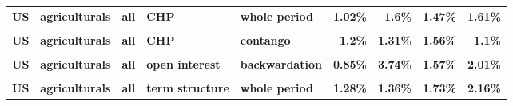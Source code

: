 \documentclass[
  authoryear,
  preprint,
  3p]{elsarticle}
\begin{document}
\begin{landscape}
\begin{longtable}[t]{>{}l>{}l>{}l>{}l>{}l>{}r>{}r>{}r>{}r}
\textbf{US} & \textbf{agriculturals} & \textbf{all} & \textbf{CHP} & \textbf{whole period} & \textcolor[HTML]{4285f4}{\textbf{1.02\%}} & \textcolor[HTML]{4285f4}{\textbf{1.6\%}} & \textcolor[HTML]{4285f4}{\textbf{1.47\%}} & \textcolor[HTML]{4285f4}{\textbf{1.61\%}}\\
\textbf{\cellcolor{gray!10}{US}} & \textbf{\cellcolor{gray!10}{agriculturals}} & \textbf{\cellcolor{gray!10}{all}} & \textbf{\cellcolor{gray!10}{CHP}} & \textbf{\cellcolor{gray!10}{backwardation}} & \textcolor[HTML]{4285f4}{\textbf{\cellcolor{gray!10}{1.14\%}}} & \textcolor[HTML]{4285f4}{\textbf{\cellcolor{gray!10}{2.47\%}}} & \textcolor[HTML]{4285f4}{\textbf{\cellcolor{gray!10}{1.72\%}}} & \textcolor[HTML]{4285f4}{\textbf{\cellcolor{gray!10}{3.11\%}}}\\
\textbf{US} & \textbf{agriculturals} & \textbf{all} & \textbf{CHP} & \textbf{contango} & \textcolor[HTML]{4285f4}{\textbf{1.2\%}} & \textcolor[HTML]{4285f4}{\textbf{1.31\%}} & \textcolor[HTML]{4285f4}{\textbf{1.56\%}} & \textcolor[HTML]{4285f4}{\textbf{1.1\%}}\\
\addlinespace
\textbf{\cellcolor{gray!10}{US}} & \textbf{\cellcolor{gray!10}{agriculturals}} & \textbf{\cellcolor{gray!10}{all}} & \textbf{\cellcolor{gray!10}{open interest}} & \textbf{\cellcolor{gray!10}{whole period}} & \textcolor[HTML]{4285f4}{\textbf{\cellcolor{gray!10}{1.09\%}}} & \textcolor[HTML]{4285f4}{\textbf{\cellcolor{gray!10}{1.9\%}}} & \textcolor[HTML]{4285f4}{\textbf{\cellcolor{gray!10}{0.45\%}}} & \textcolor[HTML]{4285f4}{\textbf{\cellcolor{gray!10}{1\%}}}\\
\textbf{US} & \textbf{agriculturals} & \textbf{all} & \textbf{open interest} & \textbf{backwardation} & \textcolor[HTML]{4285f4}{\textbf{0.85\%}} & \textcolor[HTML]{4285f4}{\textbf{3.74\%}} & \textcolor[HTML]{4285f4}{\textbf{1.57\%}} & \textcolor[HTML]{4285f4}{\textbf{2.01\%}}\\
\textbf{\cellcolor{gray!10}{US}} & \textbf{\cellcolor{gray!10}{agriculturals}} & \textbf{\cellcolor{gray!10}{all}} & \textbf{\cellcolor{gray!10}{open interest}} & \textbf{\cellcolor{gray!10}{contango}} & \textcolor[HTML]{4285f4}{\textbf{\cellcolor{gray!10}{1.58\%}}} & \textcolor[HTML]{4285f4}{\textbf{\cellcolor{gray!10}{0.97\%}}} & \textcolor[HTML]{4285f4}{\textbf{\cellcolor{gray!10}{0.58\%}}} & \textcolor[HTML]{4285f4}{\textbf{\cellcolor{gray!10}{0.67\%}}}\\
\textbf{US} & \textbf{agriculturals} & \textbf{all} & \textbf{term structure} & \textbf{whole period} & \textcolor[HTML]{4285f4}{\textbf{1.28\%}} & \textcolor[HTML]{4285f4}{\textbf{1.36\%}} & \textcolor[HTML]{4285f4}{\textbf{1.73\%}} & \textcolor[HTML]{4285f4}{\textbf{2.16\%}}\\

\end{longtable}
\end{landscape}
\end{document}
